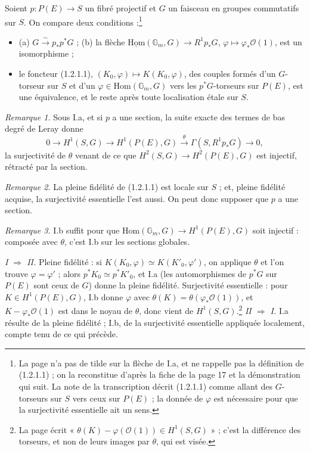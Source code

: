 \documentclass[11pt,a4paper]{article}
\begin{document}
Soient $p\colon P(E) \to S$ un fibré projectif et $G$ un faisceau en groupes
commutatifs sur $S$. On compare deux conditions :\footnote{La page n'a pas de tilde sur la flèche de I.a, et ne rappelle pas
la définition de (1.2.1.1) ; on la reconstitue d'après la fiche de la page 17
et la démonstration qui suit. La note de la transcription décrit (1.2.1.1)
comme allant des $G$-torseurs sur $S$ vers ceux sur $P(E)$ ; la donnée de
$\varphi$ est nécessaire pour que la surjectivité essentielle ait un sens.}

\begin{itemize}
\item[I.] (a) $G \xrightarrow{\sim} p_*p^*G$ ; (b) la flèche
$\underline{\mathrm{Hom}}(\mathbb{G}_m, G) \to R^1p_*G$,
$\varphi \mapsto \varphi_*\mathcal{O}(1)$, est un isomorphisme ;
\item[II.] le foncteur (1.2.1.1), $(K_0, \varphi) \mapsto K(K_0, \varphi)$,
des couples formés d'un $G$-torseur sur $S$ et d'un $\varphi \in
\mathrm{Hom}(\mathbb{G}_m, G)$ vers les $p^*G$-torseurs sur $P(E)$, est une
équivalence, et le reste après toute localisation étale sur $S$.
\end{itemize}

\emph{Remarque 1.} Sous I.a, et si $p$ a une section, la suite exacte des
termes de bas degré de Leray donne
\[
0 \to H^1(S, G) \to H^1(P(E), G) \xrightarrow{\ \theta\ } \Gamma(S, R^1p_*G) \to 0,
\]
la surjectivité de $\theta$ venant de ce que $H^2(S, G) \to H^2(P(E), G)$ est
injectif, rétracté par la section.

\emph{Remarque 2.} La pleine fidélité de (1.2.1.1) est locale sur $S$ ; et,
pleine fidélité acquise, la surjectivité essentielle l'est aussi. On peut donc
supposer que $p$ a une section.

\emph{Remarque 3.} I.b suffit pour que $\mathrm{Hom}(\mathbb{G}_m, G) \to
H^1(P(E), G)$ soit injectif : composée avec $\theta$, c'est I.b sur les
sections globales.

\emph{I $\Rightarrow$ II.} Pleine fidélité : si $K(K_0, \varphi) \simeq
K(K'_0, \varphi')$, on applique $\theta$ et l'on trouve $\varphi = \varphi'$ ;
alors $p^*K_0 \simeq p^*K'_0$, et I.a (les automorphismes de $p^*G$ sur
$P(E)$ sont ceux de $G$) donne la pleine fidélité. Surjectivité essentielle :
pour $K \in H^1(P(E), G)$, I.b donne $\varphi$ avec $\theta(K) =
\theta(\varphi_*\mathcal{O}(1))$, et $K - \varphi_*\mathcal{O}(1)$ est dans le
noyau de $\theta$, donc vient de $H^1(S, G)$.\footnote{La page écrit
« $\theta(K) - \varphi(\mathcal{O}(1)) \in H^1(S, G)$ » ; c'est la différence
des torseurs, et non de leurs images par $\theta$, qui est visée.}
\emph{II $\Rightarrow$ I.} I.a résulte de la pleine fidélité ; I.b, de la
surjectivité essentielle appliquée localement, compte tenu de ce qui précède.
\end{document}
